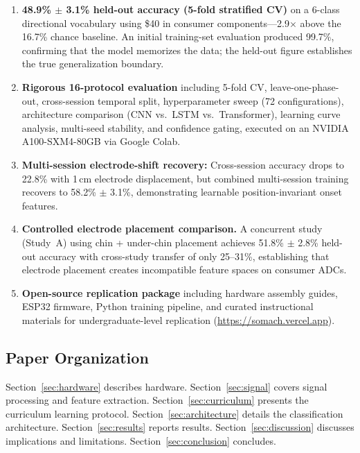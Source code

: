 \documentclass[11pt, a4paper]{article}
\begin{document}
\begin{enumerate}
    \item \textbf{48.9\% $\pm$ 3.1\% held-out accuracy (5-fold stratified CV)} on a 6-class directional vocabulary using \$40 in consumer components---2.9$\times$ above the 16.7\% chance baseline. An initial training-set evaluation produced 99.7\%, confirming that the model memorizes the data; the held-out figure establishes the true generalization boundary.
    \item \textbf{Rigorous 16-protocol evaluation} including 5-fold CV, leave-one-phase-out, cross-session temporal split, hyperparameter sweep (72 configurations), architecture comparison (CNN vs.\ LSTM vs.\ Transformer), learning curve analysis, multi-seed stability, and confidence gating, executed on an NVIDIA A100-SXM4-80GB via Google Colab.
    \item \textbf{Multi-session electrode-shift recovery:} Cross-session accuracy drops to 22.8\% with 1\,cm electrode displacement, but combined multi-session training recovers to 58.2\% $\pm$ 3.1\%, demonstrating learnable position-invariant onset features.
    \item \textbf{Controlled electrode placement comparison.} A concurrent study (Study~A) using chin + under-chin placement achieves 51.8\% $\pm$ 2.8\% held-out accuracy with cross-study transfer of only 25--31\%, establishing that electrode placement creates incompatible feature spaces on consumer ADCs.
    \item \textbf{Open-source replication package} including hardware assembly guides, ESP32 firmware, Python training pipeline, and curated instructional materials for undergraduate-level replication (\url{https://somach.vercel.app}).
\end{enumerate}

\subsection{Paper Organization}

Section~\ref{sec:hardware} describes hardware. Section~\ref{sec:signal} covers signal processing and feature extraction. Section~\ref{sec:curriculum} presents the curriculum learning protocol. Section~\ref{sec:architecture} details the classification architecture. Section~\ref{sec:results} reports results. Section~\ref{sec:discussion} discusses implications and limitations. Section~\ref{sec:conclusion} concludes.

\end{document}
